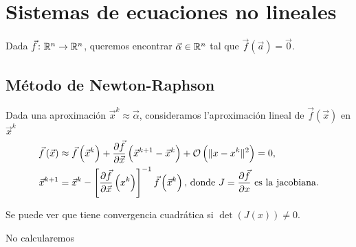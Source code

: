 \chapter{Sistemas de ecuaciones no lineales}

Dada $\vec{f} \colon \mathbb{R}^n \to \mathbb{R}^n$, queremos encontrar $\vec{\alpha} \in \mathbb{R}^n$ tal que $\vec{f}\left( \vec{a} \right) = \vec{0}$.

\section{M\'etodo de Newton-Raphson}

Dada una aproximaci\'on $\vec{x}^k \approx \vec{\alpha}$, consideramos l'aproximaci\'on lineal de $\vec{f}\left( \vec{x} \right)$ en $\vec{x}^k$
\begin{align*}
    \vec{f}\left( \vec{x} \right) &\approx \vec{f}\left( \vec{x}^k \right) + \frac{\partial \vec{f}}{\partial \vec{x}}\left( \vec{x}^{k+1}-\vec{x}^k \right) + \mathcal{O} \left( \|x-x^k\|^2 \right) = 0, \\
    \vec{x}^{k+1} &= \vec{x}^k - \left[ \frac{\partial\vec{f}}{\partial\vec{x}}\left( x^k \right) \right]^{-1} \vec{f}\left( \vec{x}^k \right),\, \text{donde } J = \frac{\partial\vec{f}}{\partial x} \text{ es la jacobiana.}
\end{align*}

Se puede ver que tiene convergencia cuadr\'atica si $\det\left( J(x) \right) \neq 0$.

\begin{obs}
    No calcularemos 
\end{obs}

